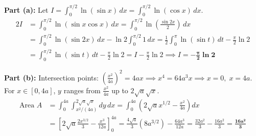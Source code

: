 \begin{solbox}
\textbf{Part (a):}
Let $I = \int_0^{\pi/2} \ln(\sin x)\,dx = \int_0^{\pi/2} \ln(\cos x)\,dx$.
\begin{align}
2I &= \int_0^{\pi/2} \ln(\sin x \cos x)\,dx = \int_0^{\pi/2} \ln\left(\frac{\sin 2x}{2}\right)\,dx \\
&= \int_0^{\pi/2} \ln(\sin 2x)\,dx - \ln 2 \int_0^{\pi/2} 1\,dx = \frac{1}{2}\int_0^\pi \ln(\sin t)\,dt - \frac{\pi}{2}\ln 2 \\
&= \int_0^{\pi/2} \ln(\sin t)\,dt - \frac{\pi}{2}\ln 2 = I - \frac{\pi}{2}\ln 2 \implies I = \mathbf{-\frac{\pi}{2}\ln 2}
\end{align}

\textbf{Part (b):}
Intersection points: $\left(\frac{x^2}{4a}\right)^2 = 4ax \implies x^4 = 64a^3 x \implies x = 0, \; x = 4a$.
For $x \in [0, 4a]$, $y$ ranges from $\frac{x^2}{4a}$ up to $2\sqrt{a}\sqrt{x}$.
\begin{align}
\text{Area } A &= \int_0^{4a} \int_{x^2/(4a)}^{2\sqrt{a}\sqrt{x}} dy\,dx = \int_0^{4a} \left( 2\sqrt{a}x^{1/2} - \frac{x^2}{4a} \right) dx \\
&= \left[ 2\sqrt{a} \frac{2x^{3/2}}{3} - \frac{x^3}{12a} \right]_0^{4a} = \frac{4\sqrt{a}}{3}(8a^{3/2}) - \frac{64a^3}{12a} = \frac{32a^2}{3} - \frac{16a^2}{3} = \mathbf{\frac{16a^2}{3}}
\end{align}
\end{solbox}
